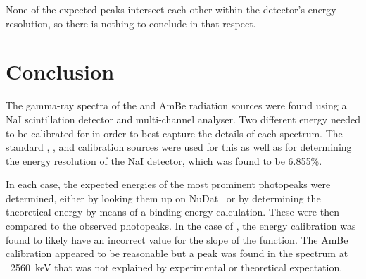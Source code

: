 \documentclass[11pt]{article}
\numberwithin{equation}{section}
\numberwithin{figure}{section}
\numberwithin{table}{section}
\begin{document}
None of the expected peaks intersect each other within the detector's energy resolution, so there is nothing to conclude in that respect. 

\section{Conclusion}\label{sec:Conclusion}
The gamma-ray spectra of the  and AmBe radiation sources were found using a NaI scintillation detector and multi-channel analyser. Two different energy needed to be calibrated for in order to best capture the details of each spectrum. The standard , , and  calibration sources were used for this as well as for determining the energy resolution of the NaI detector, which was found to be 6.855\%. 

In each case, the expected energies of the most prominent photopeaks were determined, either by looking them up on NuDat~\cite{nudat} or by determining the theoretical energy by means of a binding energy calculation. These were then compared to the observed photopeaks. In the case of , the energy calibration was found to likely have an incorrect value for the slope of the function. The AmBe calibration appeared to be reasonable but a peak was found in the spectrum at ~\SI{2560}{\kilo\electronvolt} that was not explained by experimental or theoretical expectation. 

\printbibliography
\end{document}
